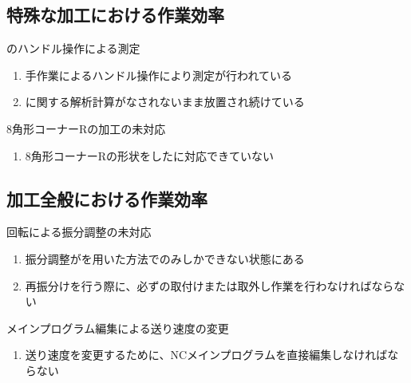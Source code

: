 \subsection{特殊な加工における作業効率}

\begin{Issues}{\CurvedOutcutMilling のハンドル操作による測定}
\begin{enumerate}[label=\sarrow]
\item[{\sarrow[red]}]手作業によるハンドル操作により測定が行われている
\item[{\sarrow[red]}]\CurvedOutcutMilling に関する解析計算がなされないまま放置され続けている
\end{enumerate}
\end{Issues}

\begin{Issues}{\Keyway 8角形コーナーRの加工の未対応}
\begin{enumerate}[label=\sarrow]
\item[{\sarrow[red]}]8角形コーナーRの形状をした\KeywayMilling に対応できていない
\end{enumerate}
\end{Issues}


\clearpage
\subsection{加工全般における作業効率}

\begin{Issues}{\Table 回転による振分調整の未対応}
\begin{enumerate}[label=\sarrow]
\item[{\sarrow[red]}]振分調整が\Spacer を用いた方法でのみしかできない状態にある
\item[{\sarrow[red]}]再振分けを行う際に、必ず\Spacer の取付けまたは取外し作業を行わなければならない
\end{enumerate}
\end{Issues}

\begin{Issues}{メインプログラム編集による送り速度の変更}
\begin{enumerate}[label=\sarrow]
\item[{\sarrow[red]}]送り速度を変更するために、NCメインプログラムを直接編集しなければならない
\end{enumerate}
\end{Issues}


